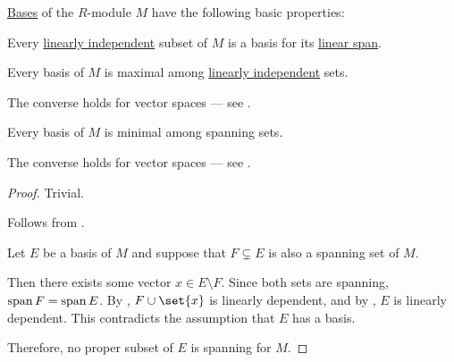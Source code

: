 \begin{proposition}\label{thm:def:hamel_basis}
  \hyperref[def:hamel_basis]{Bases} of the \( R \)-module \( M \) have the following basic properties:
  \begin{thmenum}
     Every \hyperref[def:linear_dependence]{linearly independent} subset of \( M \) is a basis for its \hyperref[def:semimodule/submodel]{linear span}.

     Every basis of \( M \) is maximal among \hyperref[thm:def:linear_dependence]{linearly independent} sets.

    The converse holds for vector spaces --- see .

     Every basis of \( M \) is minimal among spanning sets.

    The converse holds for vector spaces --- see .
  \end{thmenum}
\end{proposition}
\begin{proof}
   Trivial.

   Follows from .

   Let \( E \) be a basis of \( M \) and suppose that \( F \subsetneq E \) is also a spanning set of \( M \).

  Then there exists some vector \( x \in E \setminus F \). Since both sets are spanning, \( \operatorname{span} F = \operatorname{span} E \). By , \( F \cup \set{ x } \) is linearly dependent, and by , \( E \) is linearly dependent. This contradicts the assumption that \( E \) has a basis.

  Therefore, no proper subset of \( E \) is spanning for \( M \).
\end{proof}

